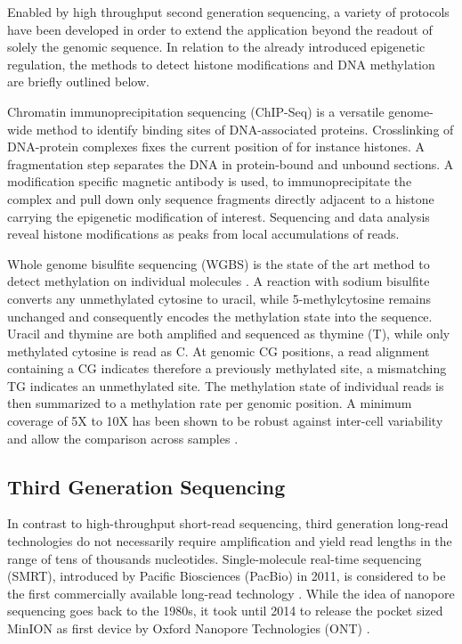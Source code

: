 Enabled by high throughput second generation sequencing, a variety of protocols have been developed in order to extend the application beyond the readout of solely the genomic sequence.
In relation to the already introduced epigenetic regulation, the methods to detect histone modifications and DNA methylation are briefly outlined below.

Chromatin immunoprecipitation sequencing (ChIP-Seq) is a versatile genome-wide method to identify binding sites of DNA-associated proteins.
Crosslinking of DNA-protein complexes fixes the current position of for instance histones. 
A fragmentation step separates the DNA in protein-bound and unbound sections.
A modification specific magnetic antibody is used, to immunoprecipitate the complex and pull down only sequence fragments directly adjacent to a histone carrying the epigenetic modification of interest.
Sequencing and data analysis reveal histone modifications as peaks from local accumulations of reads.

Whole genome bisulfite sequencing (WGBS) is the state of the art method to detect methylation on individual molecules \cite{Frommer1992}.
A reaction with sodium bisulfite converts any unmethylated cytosine to uracil, while 5-methylcytosine remains unchanged and consequently encodes the methylation state into the sequence. 
Uracil and thymine are both amplified and sequenced as thymine (T), while only methylated cytosine is read as C.
At genomic CG positions, a read alignment containing a CG indicates therefore a previously methylated site, a mismatching TG indicates an unmethylated site.
The methylation state of individual reads is then summarized to a methylation rate per genomic position.
A minimum coverage of 5X to 10X has been shown to be robust against inter-cell variability and allow the comparison across samples \cite{Ziller2015}.




\subsection{Third Generation Sequencing}
\label{subsec:intro:tgs}

In contrast to high-throughput short-read sequencing, third generation long-read technologies do not necessarily require amplification and yield read lengths in the range of tens of thousands nucleotides. 
Single-molecule real-time sequencing (SMRT), introduced by Pacific Biosciences (PacBio) in 2011, is considered to be the first commercially available long-read technology \cite{Dijk2018}.
While the idea of nanopore sequencing goes back to the 1980s, it took until 2014 to release the pocket sized MinION as first device by Oxford Nanopore Technologies (ONT) \cite{Deamer2016}.

